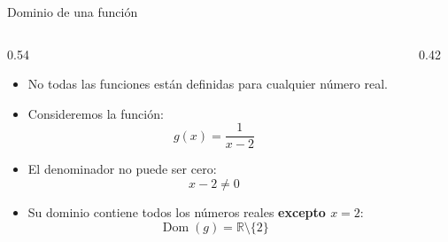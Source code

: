 \documentclass[main.tex]{subfiles}
\begin{document}
\begin{frame}{Dominio de una función}
  \begin{columns}[c,onlytextwidth]
    \begin{column}{0.54\textwidth}
      \begin{itemize}
        \item No todas las funciones están definidas para cualquier
              número real.

        \item Consideremos la función:
              \[
                g(x)=\frac{1}{x-2}
              \]

        \item El denominador no puede ser cero:
              \[
                x-2\neq 0
              \]

        \item Su dominio contiene todos los números reales
              \textbf{excepto $x=2$}:
              \[
                \operatorname{Dom}(g)=\mathbb{R}\setminus\{2\}
              \]
      \end{itemize}
    \end{column}
    \begin{column}{0.42\textwidth}
      \centering
    \end{column}
  \end{columns}
\end{frame}
\end{document}
